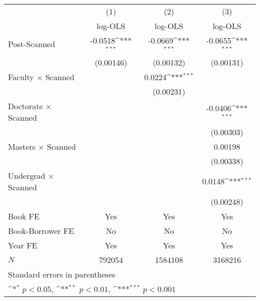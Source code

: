 {
\def\sym#1{\ifmmode^{#1}\else\(^{#1}\)\fi}
\begin{tabular}{l*{3}{c}}
\hline\hline
            &\multicolumn{1}{c}{(1)}&\multicolumn{1}{c}{(2)}&\multicolumn{1}{c}{(3)}\\
            &\multicolumn{1}{c}{log-OLS}&\multicolumn{1}{c}{log-OLS}&\multicolumn{1}{c}{log-OLS}\\
\hline
Post-Scanned&     -0.0518\sym{***}&     -0.0669\sym{***}&     -0.0655\sym{***}\\
            &   (0.00146)         &   (0.00132)         &   (0.00131)         \\
[1em]
Faculty $\times$ Scanned&                     &      0.0224\sym{***}&                     \\
            &                     &   (0.00231)         &                     \\
[1em]
Doctorate $\times$ Scanned&                     &                     &     -0.0406\sym{***}\\
            &                     &                     &   (0.00303)         \\
[1em]
Masters $\times$  Scanned&                     &                     &     0.00198         \\
            &                     &                     &   (0.00338)         \\
[1em]
Undergrad $\times$ Scanned&                     &                     &      0.0148\sym{***}\\
            &                     &                     &   (0.00248)         \\
\hline
Book FE     &         Yes         &         Yes         &         Yes         \\
Book-Borrower FE&          No         &          No         &          No         \\
Year FE     &         Yes         &         Yes         &         Yes         \\
\(N\)       &      792054         &     1584108         &     3168216         \\
\hline\hline
\multicolumn{4}{l}{\footnotesize Standard errors in parentheses}\\
\multicolumn{4}{l}{\footnotesize \sym{*} \(p<0.05\), \sym{**} \(p<0.01\), \sym{***} \(p<0.001\)}\\
\end{tabular}
}
